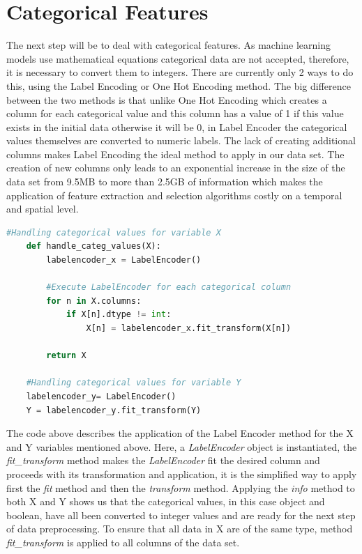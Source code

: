 \section{Categorical Features} %
\label{sec:categorical_values}
\hspace{10px}The next step will be to deal with categorical features. As machine learning models use mathematical equations categorical data are not accepted, therefore, it is necessary to convert them to integers. There are currently only 2 ways to do this, using the Label Encoding or One Hot Encoding method. The big difference between the two methods is that unlike One Hot Encoding which creates a column for each categorical value and this column has a value of 1 if this value exists in the initial data otherwise it will be 0, in Label Encoder the categorical values themselves are converted to numeric labels.
The lack of creating additional columns makes Label Encoding the ideal method to apply in our data set. The creation of new columns only leads to an exponential increase in the size of the data set from 9.5MB to more than 2.5GB of information which makes the application of feature extraction and selection algorithms costly on a temporal and spatial level.

\begin{lstlisting}[language=Python]
    #Handling categorical values for variable X
    def handle_categ_values(X):
        labelencoder_x = LabelEncoder()
        
        #Execute LabelEncoder for each categorical column
        for n in X.columns:
            if X[n].dtype != int:
                X[n] = labelencoder_x.fit_transform(X[n])
                
        return X
        
    #Handling categorical values for variable Y
    labelencoder_y= LabelEncoder()  
    Y = labelencoder_y.fit_transform(Y)
\end{lstlisting}

The code above describes the application of the Label Encoder method for the X and Y variables mentioned above. Here, a \textit{LabelEncoder} object is instantiated, the \textit{fit\_transform} method makes the \textit{LabelEncoder} fit the desired column and proceeds with its transformation and application, it is the simplified way to apply first the \textit{fit} method and then the \textit{transform} method. Applying the \textit{info} method to both X and Y shows us that the categorical values, in this case object and boolean, have all been converted to integer values and are ready for the next step of data preprocessing. To ensure that all data in X are of the same type, method \textit{fit\_transform} is applied to all columns of the data set.

